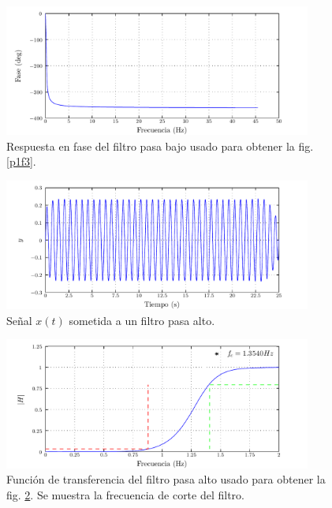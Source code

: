 \documentclass[a4paper,12pt,final]{article}
\begin{document}
    \begin{figure}[H]
      \begin{center}
        \caption{Respuesta en fase del filtro pasa bajo usado para obtener la fig. \ref{p1f3}.}
        \label{p1f6}
        \vspace{-1em}
        \includegraphics[width=0.9\textwidth]{./laboratorio_5/problema01_lowpass_filter_phase.pdf}
      \end{center}
    \end{figure}

    \begin{figure}[H]
      \begin{center}
        \caption{Señal $x\left(t\right)$ sometida a un filtro pasa alto.}
        \label{p1f7}
        \vspace{-1em}
        \includegraphics[width=0.9\textwidth]{./laboratorio_5/problema01_highpass_filtered_signal.pdf}
      \end{center}
    \end{figure}

    \begin{figure}[H]
      \begin{center}
        \caption{Función de transferencia del filtro pasa alto usado para obtener la fig. \ref{p1f7}. Se muestra la frecuencia de corte del filtro.}
        \label{p1f8}
        \vspace{-1em}
        \includegraphics[width=0.9\textwidth]{./laboratorio_5/problema01_highpass_transfer_function.pdf}
      \end{center}
    \end{figure}
\end{document}
